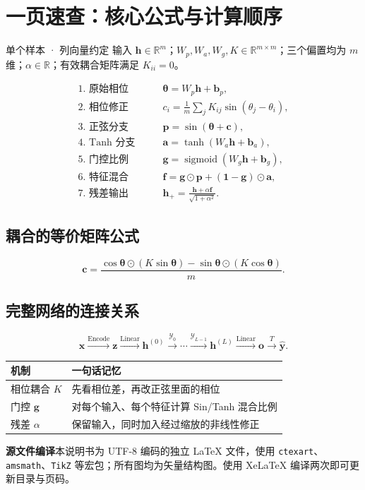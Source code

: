 \documentclass[UTF8,11pt,a4paper,fontset=fandol]{ctexart}
\newcommand{\R}{\mathbb R}
\newcommand{\sig}{\operatorname{sigmoid}}
\newcommand{\YLayer}{\mathcal{Y}}
\begin{document}
\clearpage
\appendix
\section{一页速查：核心公式与计算顺序}
\begin{explain}{单个样本 · 列向量约定}
输入 $\boldsymbol{h}\in\R^m$；$W_p,W_a,W_g,K\in\R^{m\times m}$；三个偏置均为 $m$ 维；$\alpha\in\R$；有效耦合矩阵满足 $K_{ii}=0$。
\end{explain}
\begin{align*}
\text{1. 原始相位}\qquad
&\boldsymbol{\theta}=W_p\boldsymbol{h}+\boldsymbol{b}_p,\\[5pt]
\text{2. 相位修正}\qquad
&c_i=\frac1m\sum_jK_{ij}\sin(\theta_j-\theta_i),\\[5pt]
\text{3. 正弦分支}\qquad
&\boldsymbol{p}=\sin(\boldsymbol{\theta}+\boldsymbol{c}),\\[5pt]
\text{4. Tanh 分支}\qquad
&\boldsymbol{a}=\tanh(W_a\boldsymbol{h}+\boldsymbol{b}_a),\\[5pt]
\text{5. 门控比例}\qquad
&\boldsymbol{g}=\sig(W_g\boldsymbol{h}+\boldsymbol{b}_g),\\[5pt]
\text{6. 特征混合}\qquad
&\boldsymbol{f}=\boldsymbol{g}\odot\boldsymbol{p}+(\boldsymbol{1}-\boldsymbol{g})\odot\boldsymbol{a},\\[5pt]
\text{7. 残差输出}\qquad
&\boxed{\boldsymbol{h}_{+}=\frac{\boldsymbol{h}+\alpha\boldsymbol{f}}{\sqrt{1+\alpha^2}}.}
\end{align*}
\subsection*{耦合的等价矩阵公式}
\[
\boxed{\boldsymbol{c}=\frac{
\cos\boldsymbol{\theta}\odot(K\sin\boldsymbol{\theta})
-\sin\boldsymbol{\theta}\odot(K\cos\boldsymbol{\theta})}{m}.}
\]
\subsection*{完整网络的连接关系}
\[
\boldsymbol{x}\xrightarrow{\mathrm{Encode}}\boldsymbol{z}
\xrightarrow{\mathrm{Linear}}\boldsymbol{h}^{(0)}
\xrightarrow{\YLayer_0}\cdots\xrightarrow{\YLayer_{L-1}}\boldsymbol{h}^{(L)}
\xrightarrow{\mathrm{Linear}}\boldsymbol{o}\xrightarrow{T}\widehat{\boldsymbol{y}}.
\]
\par\smallskip\noindent\begin{tabularx}{\linewidth}{@{}p{28mm}Y@{}}
\toprule
机制&一句话记忆\\\midrule
相位耦合 $K$&先看相位差，再改正弦里面的相位\\
门控 $\boldsymbol{g}$&对每个输入、每个特征计算 Sin/Tanh 混合比例\\
残差 $\alpha$&保留输入，同时加入经过缩放的非线性修正\\\bottomrule
\end{tabularx}\par\smallskip
\vfill
{\footnotesize\color{Muted}\textbf{源文件编译}\quad 本说明书为 UTF-8 编码的独立 \LaTeX{} 文件，使用 \texttt{ctexart}、\texttt{amsmath}、\texttt{TikZ} 等宏包；所有图均为矢量结构图。使用 XeLaTeX 编译两次即可更新目录与页码。}
\end{document}

